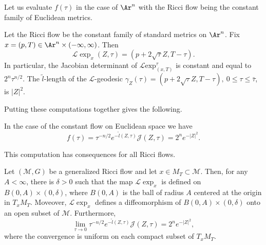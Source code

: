 Let us evaluate $f(\tau)$ in the case of $\Ar^n$ with the Ricci flow being the
constant family of Euclidean metrics.

\begin{example}\label{ex:l-exponential-euclidean}
Let the Ricci flow be the constant family of standard metrics on
$\Ar^n$. Fix $x=(p,T)\in \Ar ^n\times (-\infty,\infty)$. Then
$${\mathcal L}\exp_x(Z,\tau)=(p+2\sqrt{\tau}Z,T-\tau).$$
In particular, the Jacobian determinant of ${\mathcal L}\mathrm{exp}_{(x,T)}^\tau$ is constant and equal to $2^n\tau^{n/2}$. The
$\widetilde l$-length of the ${\mathcal L}$-geodesic
$\gamma_Z(\tau)=(p+2\sqrt{\tau}Z, T-\tau),\ 0\le \tau\le \bar\tau$,
is $|Z|^2$.
\end{example}

Putting these computations together gives the following.

\begin{claim}\label{claim:reduced-volume-integrand-euclidean}
\label{Arnquantity}
In the case of the constant flow on Euclidean space we have
$$f(\tau)=\tau^{-n/2}e^{-\tilde l(Z,\tau)}{\mathcal J}(Z,\tau)=2^ne^{-|Z|^2}.$$
\end{claim}

This computation has consequences for all Ricci flows.

\begin{proposition}\label{prop:reduced-volume-integrand-limit}
\label{Jlimit}
Let $({\mathcal M},G)$ be a generalized Ricci flow and let $x\in M_T\subset
{\mathcal M}$. Then, for any $A<\infty$, there is $\delta>0$ such that the map
${\mathcal L}\exp_x$ is defined on $B(0,A)\times (0,\delta)$, where
$B(0,A)$ is the ball of radius $A$ centered at the origin in $T_xM_T$.
Moveover, ${\mathcal L}\exp_x$ defines a diffeomorphism of $B(0,A)\times
(0,\delta)$ onto an open subset of ${\mathcal M}$. Furthermore,
$$\lim_{\tau\rightarrow 0}\tau^{-n/2}e^{-\tilde l(Z,\tau)}{\mathcal J}(Z,\tau)=2^ne^{-|Z|^2},$$
where the convergence is uniform on each compact subset of $T_xM_T$.
\end{proposition}

